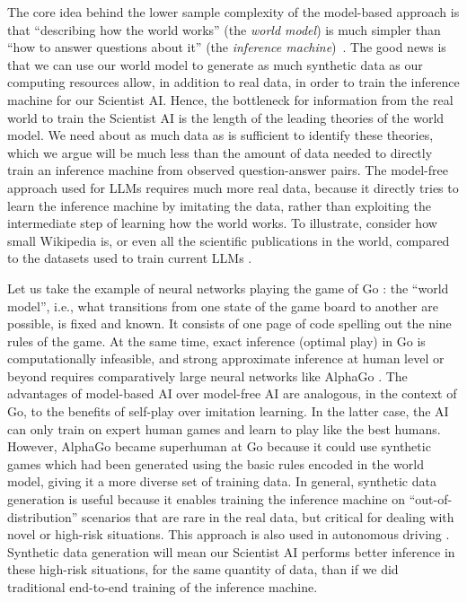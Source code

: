 The core idea behind the lower sample complexity of the model-based approach is that ``describing how the world works'' (the \emph{world model}) is much simpler than ``how to answer questions about it'' (the \emph{inference machine})~\cite{ghahramani2015probabilistic}. The good news is that we can use our world model to generate as much synthetic data as our computing resources allow, in addition to real data, in order to train the inference machine for our Scientist AI. Hence, the bottleneck for information from the real world to train the Scientist AI is the length of the leading theories of the world model. We need about as much data as is sufficient to identify these theories, which we argue will be much less than the amount of data needed to directly train an inference machine from observed question-answer pairs. The model-free approach used for LLMs requires much more real data, because it directly tries to learn the inference machine by imitating the data, rather than exploiting the intermediate step of learning how the world works. To illustrate, consider how small Wikipedia is, or even all the scientific publications in the world, compared to the datasets used to train current LLMs \cite{openreview.net.forum.id.ViZcgDQjyG}.

Let us take the example of neural networks playing the game of Go \cite{ieeexplore.ieee.org.abstract.document.7515285}: the ``world model'', i.e., what transitions from one state of the game board to another are possible, is fixed and known. It consists of one page of code spelling out the nine rules of the game. At the same time, exact inference (optimal play) in Go is computationally infeasible, and strong approximate inference at human level or beyond requires comparatively large neural networks like AlphaGo \cite{www.nature.com.articles.nature24270}. The advantages of model-based AI over model-free AI are analogous, in the context of Go, to the benefits of self-play over imitation learning. In the latter case, the AI can only train on expert human games and learn to play like the best humans. However, AlphaGo became superhuman at Go because it could use synthetic games which had been generated using the basic rules encoded in the world model, giving it a more diverse set of training data. In general, synthetic data generation is useful because it enables training the inference machine on ``out-of-distribution'' scenarios that are rare in the real data, but critical for dealing with novel or high-risk situations. This approach is also used in autonomous driving \cite{ieeexplore.ieee.org.document.9578745,www.computer.org.csdl.proceedings.article.cvpr.2022.694600r7284.1H1k7GlOq9G,openreview.net.forum.id.MfIUKzihC8}. Synthetic data generation will mean our Scientist AI performs better inference in these high-risk situations, for the same quantity of data, than if we did traditional end-to-end training of the inference machine.

